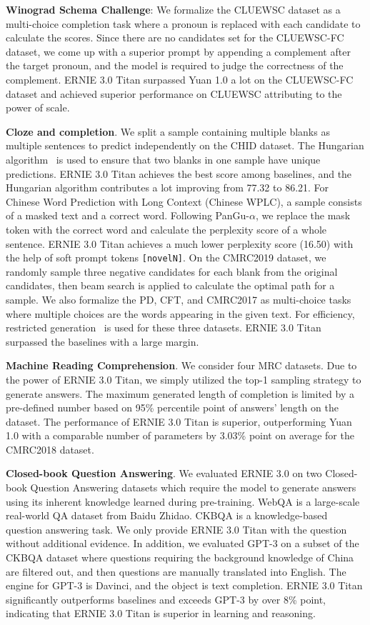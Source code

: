 \textbf{Winograd Schema Challenge}: We formalize the CLUEWSC dataset as a multi-choice completion task where a pronoun is replaced with each candidate to calculate the scores. Since there are no candidates set for the CLUEWSC-FC dataset, we come up with a superior prompt by appending a complement after the target pronoun, and the model is required to judge the correctness of the complement. ERNIE 3.0 Titan surpassed Yuan 1.0 a lot on the CLUEWSC-FC dataset and achieved superior performance on CLUEWSC attributing to the power of scale.

\textbf{Cloze and completion}. We split a sample containing multiple blanks as multiple sentences to predict independently on the CHID dataset. The Hungarian algorithm~\cite{kuhn1955hungarian} is used to ensure that two blanks in one sample have unique predictions. ERNIE 3.0 Titan achieves the best score among baselines, and the Hungarian algorithm contributes a lot improving from 77.32 to 86.21. For Chinese Word Prediction with Long Context (Chinese WPLC), a sample consists of a masked text and a correct word. Following PanGu-$\alpha$, we replace the mask token with the correct word and calculate the perplexity score of a whole sentence. ERNIE 3.0 Titan achieves a much lower perplexity score (16.50) with the help of soft prompt tokens \texttt{[novelN]}. On the CMRC2019 dataset, we randomly sample three negative candidates for each blank from the original candidates, then beam search is applied to calculate the optimal path for a sample. We also formalize the PD, CFT, and CMRC2017 as multi-choice tasks where multiple choices are the words appearing in the given text. For efficiency, restricted generation~\cite{sun2021ernie} is used for these three datasets. ERNIE 3.0 Titan surpassed the baselines with a large margin. 

\textbf{Machine Reading Comprehension}. We consider four MRC datasets. Due to the power of ERNIE 3.0 Titan, we simply utilized the top-1 sampling strategy to generate answers. The maximum generated length of completion is limited by a pre-defined number based on 95\% percentile point of answers' length on the dataset. The performance of ERNIE 3.0 Titan is superior, outperforming Yuan 1.0 with a comparable number of parameters by 3.03\% point on average for the CMRC2018 dataset.

\textbf{Closed-book Question Answering}. We evaluated ERNIE 3.0 on two Closed-book Question Answering datasets which require the model to generate answers using its inherent knowledge learned during pre-training. WebQA is a large-scale real-world QA dataset from Baidu Zhidao. CKBQA is a knowledge-based question answering task. We only provide ERNIE 3.0 Titan with the question without additional evidence. In addition, we evaluated GPT-3 on a subset of the CKBQA dataset where questions requiring the background knowledge of China are filtered out, and then questions are manually translated into English. The engine for GPT-3 is Davinci, and the object is text completion. ERNIE 3.0 Titan significantly outperforms baselines and exceeds GPT-3 by over 8\% point, indicating that ERNIE 3.0 Titan is superior in learning and reasoning. 

